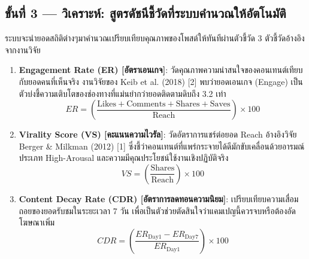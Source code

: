 \documentclass[10pt,a4paper]{article}
\begin{document}
\subsection{ขั้นที่ 3 — วิเคราะห์: สูตรดัชนีชี้วัดที่ระบบคำนวณให้อัตโนมัติ}
ระบบจะนำยอดสถิติต่างๆมาคำนวณเปรียบเทียบคุณภาพของโพสต์ให้ทันทีผ่านตัวชี้วัด 3 ตัวชี้วัดอ้างอิงจากงานวิจัย
\begin{enumerate}[label=\bfseries สูตรที่ \arabic*:]
  \item \textbf{Engagement Rate (ER) [อัตราเอนเกจ]}: วัดคุณภาพความน่าสนใจของคอนเทนต์เทียบกับยอดคนที่เห็นจริง งานวิจัยของ Keib et al. (2018) [2] พบว่ายอดเอนเกจ (Engage) เป็นตัวบ่งชี้ความเติบโตของช่องทางที่แม่นยำกว่ายอดติดตามดิบถึง 3.2 เท่า
    \begin{equation}
      ER = \left( \frac{\text{Likes} + \text{Comments} + \text{Shares} + \text{Saves}}{\text{Reach}} \right) \times 100
    \end{equation}
  \item \textbf{Virality Score (VS) [คะแนนความไวรัล]}: วัดอัตราการแชร์ต่อยอด Reach อ้างอิงวิจัย Berger \& Milkman (2012) [1] ซึ่งชี้ว่าคอนเทนต์ที่แพร่กระจายได้ดีมักขับเคลื่อนด้วยอารมณ์ประเภท High-Arousal และความมีคุณประโยชน์ใช้งานเชิงปฏิบัติจริง
    \begin{equation}
      VS = \left( \frac{\text{Shares}}{\text{Reach}} \right) \times 100
    \end{equation}
  \item \textbf{Content Decay Rate (CDR) [อัตราการลดทอนความนิยม]}: เปรียบเทียบความเสื่อมถอยของยอดรับชมในระยะเวลา 7 วัน เพื่อเป็นตัวช่วยตัดสินใจว่าแคมเปญนี้ควรจบหรือต้องอัดโฆษณาเพิ่ม
    \begin{equation}
      CDR = \left( \frac{ER_{\text{Day1}} - ER_{\text{Day7}}}{ER_{\text{Day1}}} \right) \times 100
    \end{equation}
\end{enumerate}
\end{document}
